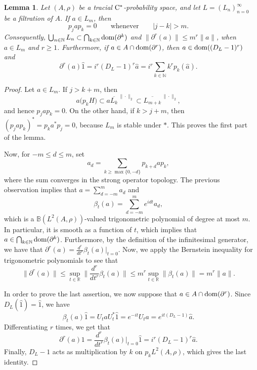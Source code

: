 \documentclass[11pt]{article}
\newtheorem{lem}[thm]{Lemma}
\theoremstyle{definition}
\theoremstyle{remark}
\numberwithin{equation}{section}
\numberwithin{equation}{section}
\def\R{\mathbb{R}}
\numberwithin{equation}{section}
\begin{document}
\begin{lem}\label{iterated}
Let $(A,\rho)$ be a tracial ${\rm C}^*$-probability space, and let
$L=(L_n)_{n=0}^\infty$ be a filtration of $A$.  If $a\in L_m$, then
\begin{equation*}
 p_jap_k=0
 \qquad\text{whenever}\qquad |j-k|>m.
\end{equation*}
Consequently, $\bigcup_{n\in\mathbb N}{L_n} \subset\bigcap_{k\in\mathbb N}{\rm dom}(\partial^k)$ and $ \|\partial^r(a)\|\leq m^r\|a\|$, when $a\in L_m$ and $r\geq1$. Furthermore, if $a\in A\cap{\rm dom}(\partial^r)$, then $a\in{\rm dom}((D_L-1)^r)$ and
\begin{equation*}
 \partial^r(a)\hat 1=i^r(D_L-1)^r\hat a=i^r\sum_{k\in\mathbb N}k^rp_k(\hat a).
\end{equation*}
\end{lem}

\begin{proof}
Let $a\in L_m$.  If $j>k+m$, then
$$
 a\bigl(p_kH\bigr)\subset a\overline{L_k}^{\,\|\cdot\|_2}\subset\overline{L_{m+k}}^{\,\|\cdot\|_2},
$$
and hence $p_jap_k=0$. On the other hand, if $k>j+m$, then $(p_jap_k)^*=p_ka^*p_j=0$, because $L_m$ is stable under $*$. This proves the first part of the lemma.

Now, for $-m\leq d\leq m$, set
\[
 a_d=\sum_{k\geq\max\{0,-d\}}p_{k+d}ap_k,
\]
where the sum converges in the strong operator topology. The previous observation implies that $a=\sum_{d=-m}^ma_d$ and
\begin{equation*}
 \beta_t(a)=\sum_{d=-m}^me^{idt}a_d,
\end{equation*}
which is a $\mathbb B(L^2(A,\rho))$-valued trigonometric polynomial of degree at most $m$. In particular, it is smooth as a function of $t$, which implies that $a\in \bigcap_{k\in\mathbb N}{\rm dom}(\partial^k) $. Furthermore, by the definition of the infinitesimal generator, we have that $\partial^r(a)=\frac{d^r}{dt^r}\beta_t(a)\big|_{t=0}$. Now, we apply the Bernstein inequality for trigonometric polynomials to see that
$$
\|\partial^r(a)\|\leq \sup_{t\in\R}\Big\|\frac{d^r}{dt^r}\beta_t(a) \Big\|\leq m^r \sup_{t\in\R}\|\beta_t(a)\|=m^r\|a\|.
$$

In order to prove the last assertion, we now suppose that $a\in A\cap{\rm dom}(\partial^r)$. Since $D_L(\hat 1)=\hat 1$, we have
\begin{equation*}
 \beta_t(a)\hat 1=U_taU_t^*\hat 1=e^{-it}U_t\hat a=e^{it(D_L-1)}\hat a.
\end{equation*}
Differentiating $r$ times, we get that
$$
 \partial^r(a)\hat1=\frac{d^r}{dt^r}\beta_t(a)\big|_{t=0}\hat 1=i^r(D_L-1)^r\hat a.
$$
Finally, $D_L-1$ acts as multiplication by $k$ on $p_kL^2(A,\rho)$, which gives the last identity.
\end{proof}
\end{document}

